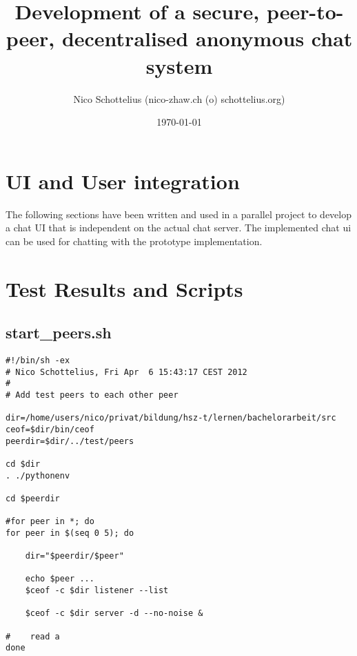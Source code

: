 \documentclass[12pt,a4paper]{report}
\begin{document}
\title{Development of a secure, peer-to-peer, decentralised anonymous chat system}
\date{\today}
\author{Nico Schottelius (nico-zhaw.ch (o) schottelius.org)}
\maketitle
\newpage
\tableofcontents
\listoftables
\listoffigures
\newpage

















\appendix
\chapter{UI and User integration}
The following sections have been written and used in a parallel project to
develop a chat UI that is independent on the actual chat server.
The implemented chat ui can be used for chatting with the prototype
implementation.
\label{chatui}



\chapter{Test Results and Scripts}
\section{start\_peers.sh}
\label{scriptstartpeers}
\begin{lstlisting}
#!/bin/sh -ex
# Nico Schottelius, Fri Apr  6 15:43:17 CEST 2012
#
# Add test peers to each other peer

dir=/home/users/nico/privat/bildung/hsz-t/lernen/bachelorarbeit/src
ceof=$dir/bin/ceof
peerdir=$dir/../test/peers

cd $dir
. ./pythonenv 

cd $peerdir

#for peer in *; do
for peer in $(seq 0 5); do

    dir="$peerdir/$peer"

    echo $peer ...
    $ceof -c $dir listener --list
    
    $ceof -c $dir server -d --no-noise &

#    read a
done
\end{lstlisting}
\end{document}
